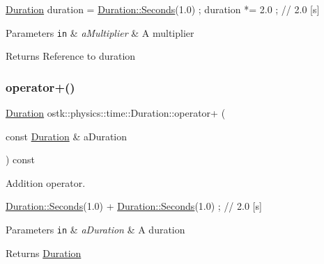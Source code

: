 \begin{DoxyCode}
\hyperlink{classostk_1_1physics_1_1time_1_1_duration_a6ba3a020742ca6e3bf0b1970dd039c07}{Duration} duration = \hyperlink{classostk_1_1physics_1_1time_1_1_duration_ad973fa34fcc308fdcc8d50c3ee694764}{Duration::Seconds}(1.0) ;
duration *= 2.0 ; \textcolor{comment}{// 2.0 [s]}
\end{DoxyCode}



\begin{DoxyParams}[1]{Parameters}
\mbox{\tt in}  & {\em a\+Multiplier} & A multiplier \\
\hline
\end{DoxyParams}
\begin{DoxyReturn}{Returns}
Reference to duration 
\end{DoxyReturn}
\mbox{\label{classostk_1_1physics_1_1time_1_1_duration_a26a68103c9ee563c99257590fbc60079}} 
\subsubsection{\texorpdfstring{operator+()}{operator+()}\hspace{0.1cm}{\footnotesize\ttfamily [1/2]}}
{\footnotesize\ttfamily \hyperlink{classostk_1_1physics_1_1time_1_1_duration}{Duration} ostk\+::physics\+::time\+::\+Duration\+::operator+ (\begin{DoxyParamCaption}\item[{const \hyperlink{classostk_1_1physics_1_1time_1_1_duration}{Duration} \&}]{a\+Duration }\end{DoxyParamCaption}) const}



Addition operator. 


\begin{DoxyCode}
\hyperlink{classostk_1_1physics_1_1time_1_1_duration_ad973fa34fcc308fdcc8d50c3ee694764}{Duration::Seconds}(1.0) + \hyperlink{classostk_1_1physics_1_1time_1_1_duration_ad973fa34fcc308fdcc8d50c3ee694764}{Duration::Seconds}(1.0) ; \textcolor{comment}{// 2.0 [s]}
\end{DoxyCode}



\begin{DoxyParams}[1]{Parameters}
\mbox{\tt in}  & {\em a\+Duration} & A duration \\
\hline
\end{DoxyParams}
\begin{DoxyReturn}{Returns}
\hyperlink{classostk_1_1physics_1_1time_1_1_duration}{Duration} 
\end{DoxyReturn}
\mbox{\label{classostk_1_1physics_1_1time_1_1_duration_a172bf36df42a169ecf5893daa3f7d7b2}} 
